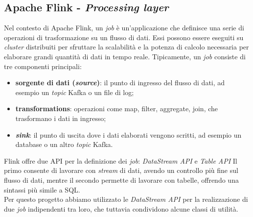 \subsection{Apache Flink - \textit{Processing layer}}
Nel contesto di Apache Flink, un \textit{job} è un'applicazione che definisce una serie di operazioni di trasformazione su un flusso di dati.
Essi possono essere eseguiti su \textit{cluster} distribuiti per sfruttare la scalabilità e la potenza di calcolo necessaria per elaborare grandi quantità di dati in tempo reale.
Tipicamente, un \textit{job} consiste di tre componenti principali:
\begin{itemize}
	\item \textbf{sorgente di dati (\textit{source})}: il punto di ingresso del flusso di dati, ad esempio un \textit{topic} Kafka o un file di log;
	\item \textbf{transformations}: operazioni come map, filter, aggregate, join, che trasformano i dati in ingresso;
	\item \textbf{\textit{sink}}: il punto di uscita dove i dati elaborati vengono scritti, ad esempio un database o un altro \textit{topic} Kafka.
\end{itemize}
Flink offre due API per la definizione dei \textit{job}: \textit{DataStream API} e \textit{Table API}
Il primo consente di lavorare con \textit{stream} di dati, avendo un controllo più fine sul flusso di dati, mentre il secondo permette di lavorare con tabelle, offrendo una sintassi più simile a SQL.\\
Per questo progetto abbiamo utilizzato le \textit{DataStream API} per la realizzazione di due \textit{job} indipendenti tra loro, che tuttavia condividono alcune classi di utilità.

